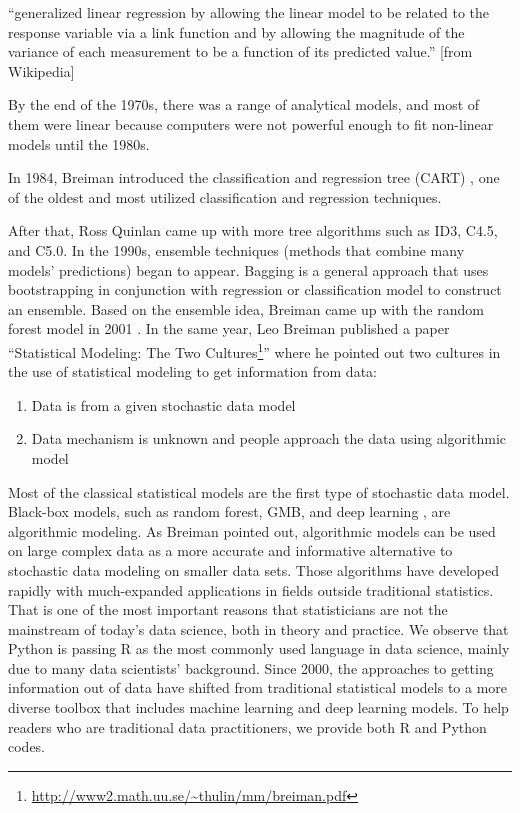 \documentclass[12pt,]{krantz}
\providecommand{\tightlist}{%
  \setlength{\itemsep}{0pt}\setlength{\parskip}{0pt}}
\renewenvironment{quote}{\begin{VF}}{\end{VF}}
\renewcommand{\href}[2]{#2\footnote{\url{#1}}}
\begin{document}
\begin{quote}
``generalized linear regression by allowing the linear model to be related to the response variable via a link function and by allowing the magnitude of the variance of each measurement to be a function of its predicted value.'' {[}from Wikipedia{]}
\end{quote}

By the end of the 1970s, there was a range of analytical models, and most of them were linear because computers were not powerful enough to fit non-linear models until the 1980s.

In 1984, Breiman introduced the classification and regression tree (CART)  , one of the oldest and most utilized classification and regression techniques\citep{Breiman1984}.

After that, Ross Quinlan came up with more tree algorithms such as ID3, C4.5, and C5.0. In the 1990s, ensemble techniques (methods that combine many models' predictions) began to appear. Bagging is a general approach that uses bootstrapping in conjunction with regression or classification model to construct an ensemble. Based on the ensemble idea, Breiman came up with the random forest  model in 2001 \citep{Breiman2001}. In the same year, Leo Breiman published a paper ``\href{http://www2.math.uu.se/~thulin/mm/breiman.pdf}{Statistical Modeling: The Two Cultures}'' \citep{Breiman2001TwoCulture} where he pointed out two cultures in the use of statistical modeling to get information from data:

\begin{enumerate}
\def\labelenumi{(\arabic{enumi})}
\tightlist
\item
  Data is from a given stochastic data model\\
\item
  Data mechanism is unknown and people approach the data using algorithmic model
\end{enumerate}

Most of the classical statistical models are the first type of stochastic data model. Black-box models, such as random forest, GMB, and deep learning   , are algorithmic modeling. As Breiman pointed out, algorithmic models can be used on large complex data as a more accurate and informative alternative to stochastic data modeling on smaller data sets. Those algorithms have developed rapidly with much-expanded applications in fields outside traditional statistics. That is one of the most important reasons that statisticians are not the mainstream of today's data science, both in theory and practice. We observe that Python is passing R as the most commonly used language in data science, mainly due to many data scientists' background. Since 2000, the approaches to getting information out of data have shifted from traditional statistical models to a more diverse toolbox that includes machine learning and deep learning models. To help readers who are traditional data practitioners, we provide both R and Python codes.
\end{document}
